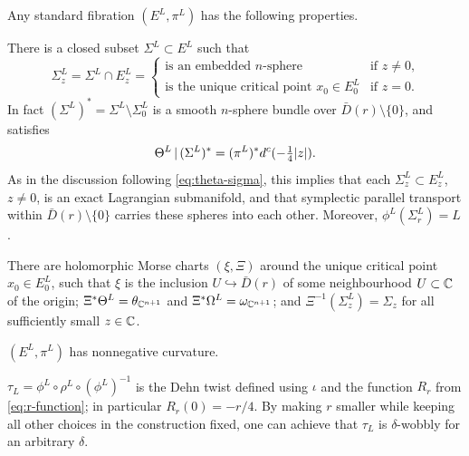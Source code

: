 \documentclass[10pt,letterpaper]{article}
\begin{document}
\begin{lemma} \label{th:standard-properties}
Any standard fibration $(E^L,\pi^L)$ has the following properties.
\begin{romanlist}
\item \label{item:lagrangian-subbundle}
There is a closed subset $\Sigma^L \subset E^L$ such that
\[
\Sigma^L_z = \Sigma^L \cap E^L_z =
 \begin{cases}
 \text{is an embedded $n$-sphere} & \text{if $z \neq 0$,} \\
 \text{is the unique critical point $x_0 \in E^L_0$} &
 \text{if $z = 0$.}
 \end{cases}
\]
In fact $(\Sigma^L)^* = \Sigma^L \setminus \Sigma^L_0$ is a smooth $n$-sphere
bundle over $\bar{D}(r) \setminus \{0\}$, and satisfies
\begin{equation} \label{eq:theta-sigma-l}
 \Theta^L \, | \, (\Sigma^L)^* =
 (\pi^L)^* d^c(-\textstyle{\textstyle\frac{1}{4}}|z|).
\end{equation}
As in the discussion following \eqref{eq:theta-sigma}, this implies that each
$\Sigma^L_z \subset E^L_z$, $z \neq 0$, is an exact Lagrangian submanifold, and
that symplectic parallel transport within $\bar{D}(r) \setminus \{0\}$ carries
these spheres into each other. Moreover, $\phi^L(\Sigma^L_r) = L$.
\item \label{item:preferred-charts}
There are holomorphic Morse charts $(\xi,\Xi)$ around the unique critical point
$x_0 \in E^L_0$, such that $\xi$ is the inclusion $U \hookrightarrow
\bar{D}(r)$ of some neighbourhood $U \subset \mathbb{C}$ of the origin; $\Xi^*\Theta^L
= \theta_{\mathbb{C}^{n+1}}$ and $\Xi^*\Omega^L = \omega_{\mathbb{C}^{n+1}}$; and
$\Xi^{-1}(\Sigma^L_z) = \Sigma_z$ for all sufficiently small $z \in \mathbb{C}$.
\item \label{item:nonnegatively-curved}
$(E^L,\pi^L)$ has nonnegative curvature.
\item \label{item:precise-twist}
$\tau_L = \phi^L \circ \rho^L \circ (\phi^L)^{-1}$ is the Dehn twist defined
using $\iota$ and the function $R_r$ from \eqref{eq:r-function}; in particular
$R_r(0) = -r/4$. By making $r$ smaller while keeping all other choices in the
construction fixed, one can achieve that $\tau_L$ is $\delta$-wobbly for an
arbitrary $\delta$.
\end{romanlist}
\end{lemma}
\end{document}
